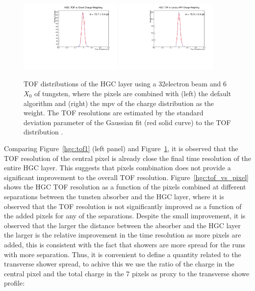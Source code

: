 \begin{figure}[h] 
\centering
\includegraphics[width=0.45\textwidth]{HGC/deltaTPicoSilEventCharge104.pdf} 
\includegraphics[width=0.45\textwidth]{HGC/deltaTPicoSilLandauCharge104.pdf} 
\caption{TOF distributions of the HGC layer using a 32\GeV electron
  beam and 6$X_{0}$ of tungsten, where the pixels are
  combined with (left) the default algorithm and (right) the mpv of
  the charge distribution as the weight. The TOF resolutions are estimated by the
standard deviation parameter of the Gaussian fit (red solid curve) to the TOF distribution
.} 
\label{hgc:tof2} 
\end{figure}

Comparing Figure~\ref{hgc:tof1} (left panel) and
Figure~\ref{hgc:tof2}, it is observed that the TOF resolution of the
central pixel is already close the final time resolution of the entire
HGC layer. This suggests that pixels combination does not provide a
significant improvement to the overall TOF
resolution. Figure~\ref{hgc:tof_vs_pixel} shows the HGC TOF resolution
as a function of the pixels combined at different separations between
the tunsten absorber and the HGC layer, where it is observed that the
TOF resolution is not significantly improved as a function of the
added pixels for any of the separations. Despite the small
improvement, it is observed that the larger the distance between the
absorber and the HGC layer the larger is the relative improvement in
the time resolution as more pixels are added, this is consistent with
the fact that showers are more spread for the runs with more
separation. Thus, it is convenient to define a quantity related to the
transverse shower spread, to achive this we use the ratio of the
charge in the central pixel and the total charge in the 7 pixels as
proxy to the transverse showe profile:

